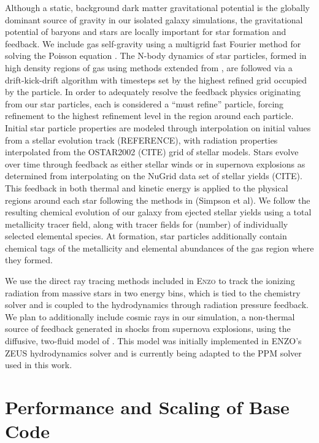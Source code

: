 \documentclass[11pt]{article}
\begin{document}
Although a static, background dark matter gravitational potential is the globally dominant source of gravity in our isolated galaxy simulations, the gravitational potential of baryons and stars are locally important for star formation and feedback. We include gas self-gravity using a multigrid fast Fourier method for solving the Poisson equation \citep{HockneyEastwood1988}. The N-body dynamics of star particles, formed in high density regions of gas using methods extended from \cite{Goldbaum}, are followed via a drift-kick-drift algorithm \citep{HickneyEastwood1988} with timesteps set by the highest refined grid occupied by the particle. In order to adequately resolve the feedback physics originating from our star particles, each is considered a ``must refine'' particle, forcing refinement to the highest refinement level in the region around each particle. Initial star particle properties are modeled through interpolation on initial values from a stellar evolution track (REFERENCE), with radiation properties interpolated from the OSTAR2002 (CITE) grid of stellar models. Stars evolve over time through feedback as either stellar winds or in supernova explosions as determined from interpolating on the NuGrid data set of stellar yields (CITE). This feedback in both thermal and kinetic energy is applied to the physical regions around each star following the methods in (Simpson et al). We follow the resulting chemical evolution of our galaxy from ejected stellar yields using a total metallicity tracer field, along with tracer fields for (number) of individually selected elemental species. At formation, star particles additionally contain chemical tags of the metallicity and elemental abundances of the gas region where they formed.

We use the direct ray tracing methods included in \textsc{Enzo} to track the ionizing radiation from massive stars in two energy bins, which is tied to the chemistry solver and is coupled to the hydrodynamics through radiation pressure feedback. We plan to additionally include cosmic rays in our simulation, a non-thermal source of feedback generated in shocks from supernova explosions, using the diffusive, two-fluid model of \cite{Salem}. This model was initially implemented in \textsc{ENZO}'s ZEUS hydrodynamics solver and is currently being adapted to the PPM solver used in this work. 

\section{Performance and Scaling of Base Code}
\end{document}
